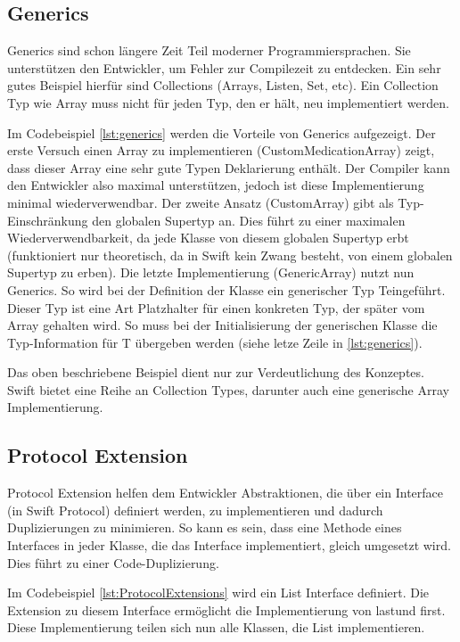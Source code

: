 \subsection{Generics}
Generics sind schon längere Zeit Teil moderner Programmiersprachen. Sie unterstützen den Entwickler, um Fehler zur Compilezeit zu entdecken. Ein sehr gutes Beispiel hierfür sind Collections (Arrays, Listen, Set, etc). Ein Collection Typ wie Array muss nicht für jeden Typ, den er hält, neu implementiert werden.

Im Codebeispiel \ref{lst:generics} werden die Vorteile von Generics aufgezeigt. Der erste Versuch einen Array zu implementieren (CustomMedicationArray) zeigt, dass dieser Array eine sehr gute Typen Deklarierung enthält. Der Compiler kann den Entwickler also maximal unterstützen, jedoch ist diese Implementierung minimal wiederverwendbar. Der zweite Ansatz (CustomArray) gibt als Typ-Einschränkung den globalen Supertyp an. Dies führt zu einer maximalen Wiederverwendbarkeit, da jede Klasse von diesem globalen Supertyp erbt (funktioniert nur theoretisch, da in Swift kein Zwang besteht, von einem globalen Supertyp zu erben).
Die letzte Implementierung (GenericArray) nutzt nun Generics. So wird bei der Definition der Klasse ein generischer Typ \glqq T\grqq  eingeführt. Dieser Typ ist eine Art Platzhalter für einen konkreten Typ, der später vom Array gehalten wird. So muss bei der Initialisierung der generischen Klasse die Typ-Information für T übergeben werden (siehe letze Zeile in \ref{lst:generics}).

Das oben beschriebene Beispiel dient nur zur Verdeutlichung des Konzeptes. Swift bietet eine Reihe an Collection Types, darunter auch eine generische Array Implementierung. 

\subsection{Protocol Extension}
Protocol Extension helfen dem Entwickler Abstraktionen, die über ein Interface (in Swift Protocol) definiert werden, zu implementieren und dadurch Duplizierungen zu minimieren. So kann es sein, dass eine Methode eines Interfaces in jeder Klasse, die das Interface implementiert, gleich umgesetzt wird. Dies führt zu einer Code-Duplizierung. 

Im Codebeispiel \ref{lst:ProtocolExtensions} wird ein List Interface definiert. Die Extension zu diesem Interface ermöglicht die Implementierung von \glqq last\grqq  und \glqq first\grqq. Diese Implementierung teilen sich nun alle Klassen, die List implementieren.

